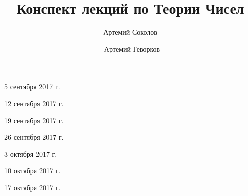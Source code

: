 \documentclass[%
  a4paper,%
  titlepage,%
  11pt%
]{article}%
\title{Конспект лекций по Теории Чисел}
\author{Артемий Соколов \and~Артемий Геворков}
\begin{document}
    
    
    \tableofcontents

    \pagestyle{fancy}

    \begin{lecture}{5 сентября 2017 г.}
        
    \end{lecture}

    \begin{lecture}{12 сентября 2017 г.}
        
    \end{lecture}

    \begin{lecture}{19 сентября 2017 г.}
        
    \end{lecture}

    \begin{lecture}{26 сентября 2017 г.}
        
    \end{lecture}

    \begin{lecture}{3 октября 2017 г.}
        
    \end{lecture}

    \begin{lecture}{10 октября 2017 г.}
        
    \end{lecture}

    \begin{lecture}{17 октября 2017 г.}
        
    \end{lecture}
\end{document}
